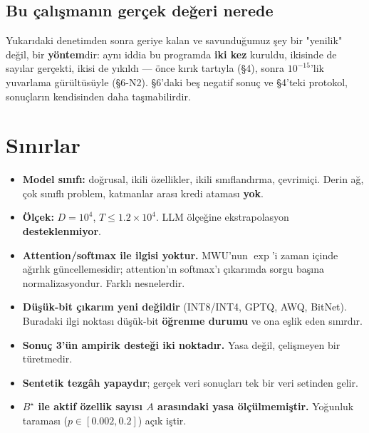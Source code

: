 \documentclass[11pt]{article}
\begin{document}
\subsection*{Bu çalışmanın gerçek değeri nerede}
Yukarıdaki denetimden sonra geriye kalan ve savunduğumuz şey bir "yenilik" değil, bir \textbf{yöntem}dir: aynı iddia bu programda \textbf{iki kez} kuruldu, ikisinde de sayılar gerçekti, ikisi de yıkıldı — önce kırık tartıyla (§4), sonra $10^{-15}$'lik yuvarlama gürültüsüyle (§6-N2). §6'daki beş negatif sonuç ve §4'teki protokol, sonuçların kendisinden daha taşınabilirdir.
\section*{Sınırlar}
\begin{itemize}\item \textbf{Model sınıfı:} doğrusal, ikili özellikler, ikili sınıflandırma, çevrimiçi. Derin ağ, çok sınıflı problem, katmanlar arası kredi ataması \textbf{yok}.
\item \textbf{Ölçek:} $D=10^4$, $T\le 1.2\times10^4$. LLM ölçeğine ekstrapolasyon \textbf{desteklenmiyor}.
\item \textbf{Attention/softmax ile ilgisi yoktur.} MWU'nun $\exp$'i zaman içinde ağırlık güncellemesidir; attention'ın softmax'ı çıkarımda sorgu başına normalizasyondur. Farklı nesnelerdir.
\item \textbf{Düşük-bit çıkarım yeni değildir} (INT8/INT4, GPTQ, AWQ, BitNet). Buradaki ilgi noktası düşük-bit \textbf{öğrenme durumu} ve ona eşlik eden sınırdır.
\item \textbf{Sonuç 3'ün ampirik desteği iki noktadır.} Yasa değil, çelişmeyen bir türetmedir.
\item \textbf{Sentetik tezgâh yapaydır}; gerçek veri sonuçları tek bir veri setinden gelir.
\item \textbf{$B^\star$ ile aktif özellik sayısı $A$ arasındaki yasa ölçülmemiştir.} Yoğunluk taraması ($p\in[0.002, 0.2]$) açık iştir.
\end{itemize}
\end{document}
